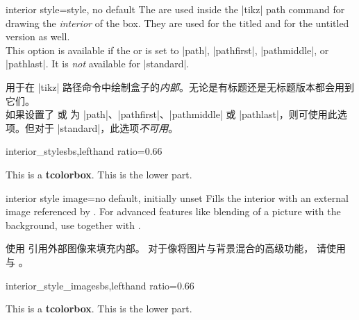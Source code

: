 \begin{docTcbKey}{interior style}{=}{style, no default}
The  are used inside the |tikz| path command
for drawing the \emph{interior} of the box. They are used for the titled
and for the untitled version as well.\\
This option is available if the 
or  is set to
|path|, |pathfirst|, |pathmiddle|, or |pathlast|.
It is \emph{not} available for |standard|.

 用于在 |tikz| 路径命令中绘制盒子的\emph{内部}。无论是有标题还是无标题版本都会用到它们。\\ 如果设置了  或  为 |path|、|pathfirst|、|pathmiddle| 或 |pathlast|，则可使用此选项。但对于 |standard|，此选项\emph{不可用}。
\begin{exdispExample*}{interior_style}{sbs,lefthand ratio=0.66}

\begin{tcolorbox}[enhanced,title=My title,
interior style={left color=red!20!white,
                right color=yellow!50!white}]
This is a \textbf{tcolorbox}.
\tcblower
This is the lower part.
\end{tcolorbox}
\end{exdispExample*}
\end{docTcbKey}

\begin{docTcbKey}{interior style image}{=}{no default, initially unset}
Fills the interior with an external image referenced by .
For advanced features like blending of a picture with the background,
use  together with .

使用  引用外部图像来填充内部。 对于像将图片与背景混合的高级功能， 请使用  与 。
\begin{exdispExample*}{interior_style_image}{sbs,lefthand ratio=0.66}

\begin{tcolorbox}[enhanced,title=My title,
interior style image=goldshade.png]
This is a \textbf{tcolorbox}.
\tcblower
This is the lower part.
\end{tcolorbox}
\end{exdispExample*}
\end{docTcbKey}


